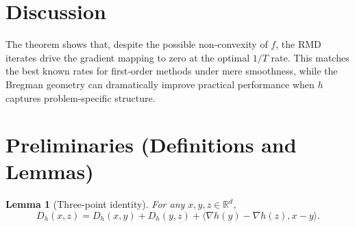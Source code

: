 \documentclass{article}
\newtheorem{lemma}{Lemma}
\newcommand{\Breg}{D_{h}}
\newcommand{\grad}{\nabla}
\newcommand{\R}{\mathbb{R}}
\begin{document}
\section*{Discussion}
The theorem shows that, despite the possible non‑convexity of $f$, the RMD iterates drive the gradient mapping to zero at the optimal $1/T$ rate. This matches the best known rates for first‑order methods under mere smoothness, while the Bregman geometry can dramatically improve practical performance when $h$ captures problem‑specific structure.

\newpage
\section*{Preliminaries (Definitions and Lemmas)}

\begin{lemma}[Three‑point identity]\label{lem:3pt}
For any $x,y,z\in\R^{d}$,
\[
\Breg(x,z)=\Breg(x,y)+\Breg(y,z)+\langle \grad h(y)-\grad h(z),x-y\rangle .
\]
\end{lemma}
\end{document}
